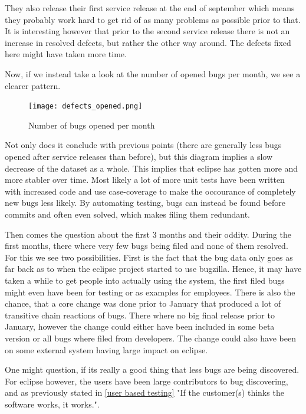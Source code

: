 \documentclass{article}
\begin{document}
They also release their first service release at the end of september which means they probably work hard to get rid of as many problems as possible prior to that.
It is interesting however that prior to the second service release there is not an increase in resolved defects, but rather the other way around. 
The defects fixed here might have taken more time.

Now, if we instead take a look at the number of opened bugs per month, we see a clearer pattern.
\begin{figure}[H]
\center
\texttt{[image: defects\_opened.png]}
\caption{Number of bugs opened per month}
\end{figure}
Not only does it conclude with previous points (there are generally less bugs opened after service releases than before), but this diagram implies a slow decrease of the dataset as a whole.
This implies that eclipse has gotten more and more stabler over time.
Most likely a lot of more unit tests have been written with increased code and use case-coverage to make the occourance of completely new bugs less likely.
By automating testing, bugs can instead be found before commits and often even solved, which makes filing them redundant.

Then comes the question about the first 3 months and their oddity.
During the first months, there where very few bugs being filed and none of them resolved.
For this we see two possibilities.
First is the fact that the bug data only goes as far back as to when the eclipse project started to use bugzilla.
Hence, it may have taken a while to get people into actually using the system, the first filed bugs might even have been for testing or as examples for employees.
There is also the chance, that a core change was done prior to January that produced a lot of transitive chain reactions of bugs.
There where no big final release prior to January, however the change could either have been included in some beta version or all bugs where filed from developers. 
The change could also have been on some external system having large impact on eclipse.

One might question, if its really a good thing that less bugs are being discovered.
For eclipse however, the users have been large contributors to bug discovering, and as previously stated in \ref{user based testing} "If the customer(s) thinks the software works, it works.".

\end{document}

